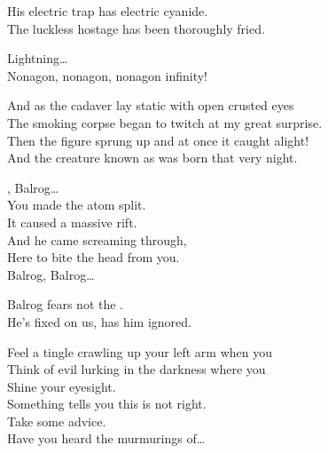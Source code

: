 
His electric trap has electric cyanide. \\
The luckless hostage has been thoroughly fried. \\


Lightning… \\

Nonagon, nonagon, nonagon infinity! \\


And as the cadaver lay static with open crusted eyes \\
The smoking corpse began to twitch at my great surprise. \\

Then the figure sprung up and at once it caught alight! \\
And the creature known as  was born that very night. \\





, Balrog… \\

You made the atom split. \\
It caused a massive rift. \\
And he came screaming through, \\
Here to bite the head from you. \\

Balrog, Balrog… \\


Balrog fears not the . \\
He's fixed on us, has him ignored. \\


Feel a tingle crawling up your left arm when you \\
Think of evil lurking in the darkness where you \\
Shine your eyesight. \\
Something tells you this is not right. \\
Take some advice. \\
Have you heard the murmurings of… \\

